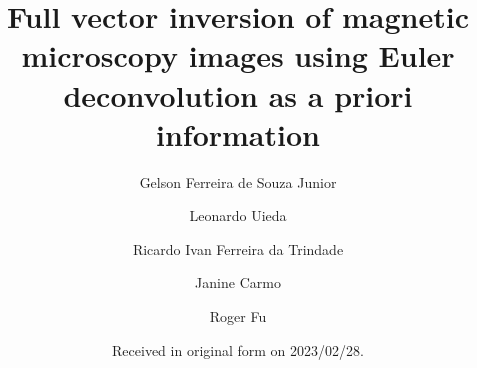 

\newcommand{\Title}{
  Full vector inversion of magnetic microscopy images using Euler deconvolution
  as a priori information
}
\newcommand{\TitleShort}{
  Magnetic microscopy inversion
}
\title{\Title}
\newcommand{\Year}{2021}
\newcommand{\SubmittedOn}{2023/02/28}
\date{Received in original form on \SubmittedOn.}
\newcommand{\Journal}{Geochemistry, Geophysics, Geosystems}

\newcommand{\AuthorShort}{Souza-Junior \textit{et al.}}
\author[1*]{Gelson Ferreira de Souza Junior}
\author[2]{Leonardo Uieda}
\author[1]{Ricardo Ivan Ferreira da Trindade}
\author[1]{Janine Carmo}
\author[3]{Roger Fu}

\newcommand{\PreprintDOI}{XXXX}
\newcommand{\JournalDOI}{YYYYY}

\newcommand{\Keywords}{%
  ADD KEYWORDS
}
